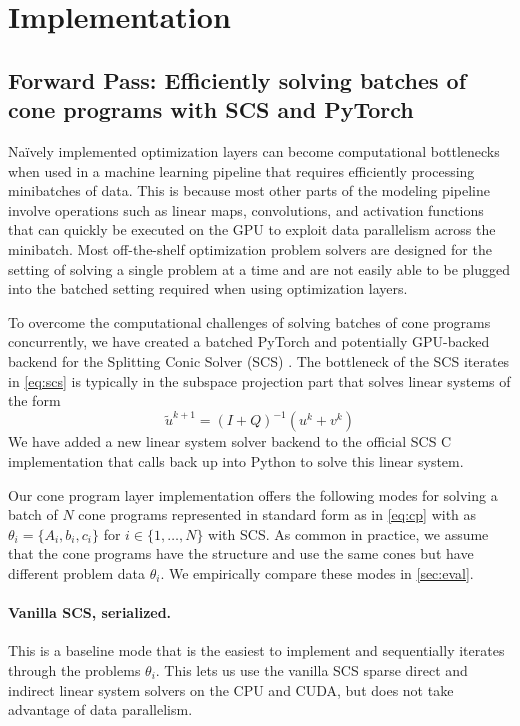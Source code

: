 \section{Implementation}
\subsection{Forward Pass: Efficiently solving batches of
  cone programs with SCS and PyTorch}
\label{sec:cp:efficient}

Na\"ively implemented optimization layers can become
computational bottlenecks when used in a machine learning
pipeline that requires efficiently processing
minibatches of data.
This is because most other parts of the modeling pipeline
involve operations such as linear maps, convolutions,
and activation functions that can quickly be executed
on the GPU to exploit data parallelism across the minibatch.
Most off-the-shelf optimization problem solvers are designed for
the setting of solving a single problem at a time and are not easily
able to be plugged into the batched setting required
when using optimization layers.

To overcome the computational challenges of solving batches
of cone programs concurrently, we have created a batched
PyTorch and potentially GPU-backed backend for the
Splitting Conic Solver (SCS) \citep{odonoghue2016conic}.
The bottleneck of the SCS iterates in \cref{eq:scs}
is typically in the subspace projection part that solves
linear systems of the form
\begin{equation}
  \tilde u^{k+1} = (I + Q)^{-1} (u^k + v^k )
\end{equation}
We have added a new linear system solver backend to the
official SCS C implementation that calls back
up into Python to solve this linear system.

Our cone program layer implementation offers the following
modes for solving a batch of $N$ cone programs
represented in standard form as in \cref{eq:cp} with
as $\theta_i=\{A_i, b_i, c_i\}$
for $i\in\{1, \ldots, N\}$ with SCS.
As common in practice, we assume that the cone programs
have the structure and use the same cones but have
different problem data $\theta_i$.
We empirically compare these modes in \cref{sec:eval}.

\paragraph{Vanilla SCS, serialized.}
This is a baseline mode that is the easiest to implement and sequentially
iterates through the problems $\theta_i$.
This lets us use the vanilla SCS sparse direct and indirect
linear system solvers on the CPU and CUDA, but does
not take advantage of data parallelism.

